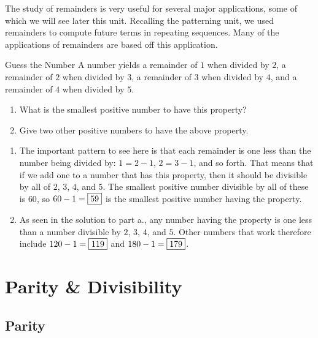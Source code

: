 \documentclass[a4paper,10pt]{report}
\begin{document}
The study of remainders is very useful for several major applications, some of
which we will see later this unit. Recalling the patterning unit, we used
remainders to compute future terms in repeating sequences. Many of the
applications of remainders are based off this application.

\begin{problem}{Guess the Number}
 A number yields a remainder of \(1\) when divided by \(2\), a remainder of
 \(2\) when divided by \(3\), a remainder of \(3\) when divided by \(4\), and a
 remainder of \(4\) when divided by \(5\).

 \begin{enumerate}[\hspace{1cm}a.]
  \item What is the smallest positive number to have this property?
  \item Give two other positive numbers to have the above property.
 \end{enumerate}

 \begin{solution}
   \begin{enumerate}[\hspace{1cm}a.]
     \item The important pattern to see here is that each remainder is one less
     than the number being divided by: \(1 = 2 - 1\), \(2 = 3 - 1\), and so
     forth. That means that if we add one to a number that has this property,
     then it should be divisible by all of \(2\), \(3\), \(4\), and \(5\). The
     smallest positive number divisible by all of these is \(60\), so \(60 - 1
     = \Ans{59}\) is the smallest positive number having the property.
     \item As seen in the solution to part a., any number having the property
     is one less than a number divisible by \(2\), \(3\), \(4\), and \(5\).
     Other numbers that work therefore include \(120 - 1 = \Ans{119}\) and
     \(180 - 1 = \Ans{179}\).
   \end{enumerate}
 \end{solution}
\end{problem}

\chapter{Parity \& Divisibility}

\section{Parity}
\end{document}
